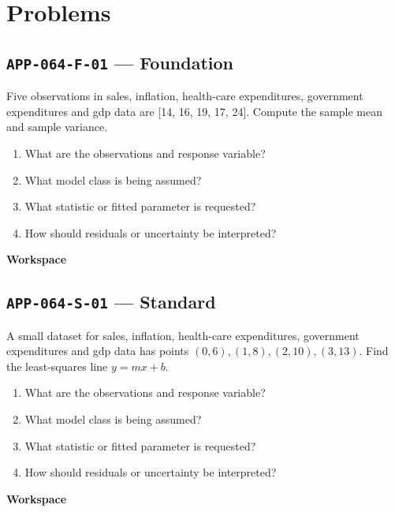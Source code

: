 \documentclass[11pt]{book}
\newcommand{\pid}[1]{\texttt{#1}}
\newcommand{\workspace}{\par\vspace{0.7in}\hrulefill\par\vspace{0.55in}\hrulefill\par}
\begin{document}
\section*{Problems}
\subsection*{\pid{APP-064-F-01} — Foundation}
\begin{problembox}
Five observations in sales, inflation, health-care expenditures, government expenditures and gdp data are [14, 16, 19, 17, 24]. Compute the sample mean and sample variance.
\end{problembox}
\begin{promptbox}\begin{enumerate}
\item What are the observations and response variable?
\item What model class is being assumed?
\item What statistic or fitted parameter is requested?
\item How should residuals or uncertainty be interpreted?
\end{enumerate}\end{promptbox}
\textbf{Workspace}\workspace
{}
\subsection*{\pid{APP-064-S-01} — Standard}
\begin{problembox}
A small dataset for sales, inflation, health-care expenditures, government expenditures and gdp data has points $(0,6),(1,8),(2,10),(3,13)$. Find the least-squares line $y=mx+b$.
\end{problembox}
\begin{promptbox}\begin{enumerate}
\item What are the observations and response variable?
\item What model class is being assumed?
\item What statistic or fitted parameter is requested?
\item How should residuals or uncertainty be interpreted?
\end{enumerate}\end{promptbox}
\textbf{Workspace}\workspace
{}
\end{document}
